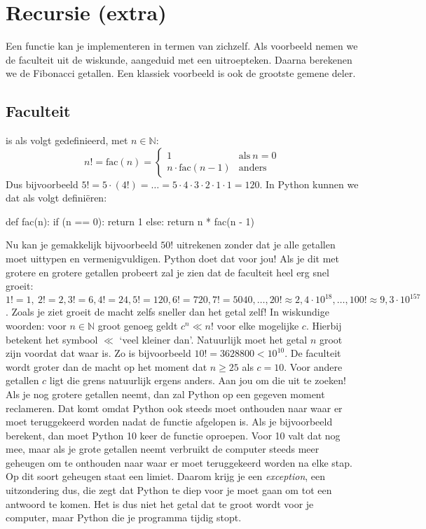 \section{Recursie (extra)}
  Een functie kan je implementeren in termen van zichzelf. Als voorbeeld nemen
  we de faculteit uit de wiskunde, aangeduid met een uitroepteken. Daarna
  berekenen we de Fibonacci getallen. Een klassiek voorbeeld is ook de grootste
  gemene deler.
  \subsection{Faculteit} is als volgt gedefinieerd, met $n \in \mathbb{N}$:
  \begin{equation*}
    n! = \text{fac}\left(n\right) =
    \begin{cases}
      1                                & \text{als}\ n = 0 \\
      n\cdot\text{fac}\left(n-1\right) & \text{anders}
    \end{cases}
  \end{equation*}
  Dus bijvoorbeeld
  $5!=5\cdot(4!)= \ldots = 5\cdot4\cdot3\cdot2\cdot1\cdot1 = 120$. In Python
  kunnen we dat als volgt defini\"eren:
  \begin{python}
    def fac(n):
      if (n == 0): return 1
      else: return n * fac(n - 1)
  \end{python}
  Nu kan je gemakkelijk bijvoorbeeld $50!$ uitrekenen zonder dat je alle
  getallen moet uittypen en vermenigvuldigen. Python doet dat voor jou! Als je
  dit met grotere en grotere getallen probeert zal je zien dat de faculteit heel
  erg snel groeit: $1!=1,\ 2!=2, 3!=6, 4!=24, 5!=120, 6!=720, 7!=5040, \ldots, 20!
  \approx 2,4\cdot10^{18}, \ldots, 100! \approx 9,3\cdot10^{157}$. Zoals je ziet
  groeit de macht zelfs sneller dan het getal zelf! In wiskundige woorden:
  voor $n \in \mathbb{N}$ groot genoeg geldt $c^n\ll n!$ voor elke mogelijke
  $c$. Hierbij betekent het symbool $\ll$ `veel kleiner dan'. Natuurlijk moet
  het getal $n$ groot zijn voordat dat waar is. Zo is bijvoorbeeld $10! =
  3628800 < 10^{10}$. De faculteit wordt groter dan de macht op het moment dat
  $n \geq 25$ als $c = 10$. Voor andere getallen $c$ ligt die grens natuurlijk
  ergens anders. Aan jou om die uit te zoeken!
  \\[1em]
  Als je nog grotere getallen neemt, dan zal Python op een gegeven moment
  reclameren. Dat komt omdat Python ook steeds moet onthouden naar waar er moet
  teruggekeerd worden nadat de functie afgelopen is. Als je bijvoorbeeld
   berekent, dan moet Python 10 keer de functie  oproepen.
  Voor 10 valt dat nog mee, maar als je grote getallen neemt verbruikt de
  computer steeds meer geheugen om te onthouden naar waar er moet teruggekeerd
  worden na elke stap. Op dit soort geheugen staat een limiet. Daarom krijg je
  een \emph{exception}, een uitzondering dus, die zegt dat Python te diep voor
  je moet gaan om tot een antwoord te komen. Het is dus niet het getal dat te
  groot wordt voor je computer, maar Python die je programma tijdig stopt.

